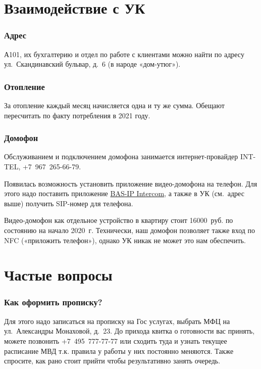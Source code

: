 \documentclass[10pt,landscape,a4paper]{article}
\begin{document}
\begin{multicols*}{3}
  \vfill\null
  \columnbreak
  
  \section*{Взаимодействие с УК}
  \subsubsection*{Адрес}
  А101, их бухгалтерию и отдел по работе с клиентами можно найти по адресу ул.~Скандинавский бульвар, д.~6 (в народе «дом-утюг»).
  
  \subsubsection*{Отопление}
  За отопление каждый месяц начисляется одна и ту же сумма. Обещают пересчитать по факту потребления в 2021 году.

  \subsubsection*{Домофон}
  Обслуживанием и подключением домофона занимается интернет-провайдер INT-TEL, +7~967~265-66-79.

  Появилась возможность установить приложение видео-домофона на телефон. Для этого надо поставить приложение
  \href{https://play.google.com/store/apps/details?id=com.basip.app}{BAS-IP Intercom}, а также в УК (см.~адрес выше) получить SIP-номер для
  телефона.

  Видео-домофон как отдельное устройство в квартиру стоит 16000~руб. по состоянию на начало 2020~г. Технически, наш домофон позволяет также
  вход по NFC («приложить телефон»), однако УК никак не может это нам обеспечить.

  \vfill\null
  \columnbreak

  \section*{Частые вопросы}
  \subsubsection*{Как оформить прописку?}

  Для этого надо записаться на прописку на Гос услугах, выбрать МФЦ на ул.~Александры Монаховой, д.~23. До прихода квитка о готовности вас
  принять, можете позвонить +7~495~777-77-77 или сходить туда и узнать текущее расписание МВД т.к. правила у работы у них постоянно
  меняются. Также спросите, как рано стоит прийти чтобы результативно занять очередь.


\end{multicols*}
\end{document}
